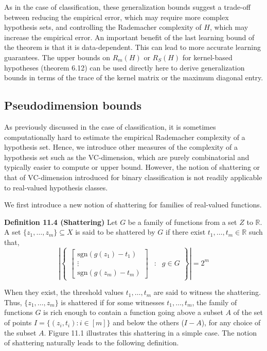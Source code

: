 \documentclass[fleqn,10pt]{olplainarticle}
\begin{document}
As in the case of classification, these generalization bounds suggest a trade-off between reducing the empirical error, which may require more complex hypothesis sets, and controlling the Rademacher complexity of \(H\), which may increase the empirical error. An important benefit of the last learning bound of the theorem is that it is data-dependent. This can lead to more accurate learning guarantees. The upper bounds on \(R_m(H)\) or \(R_S(H)\) for kernel-based hypotheses (theorem 6.12) can be used directly here to derive generalization bounds in terms of the trace of the kernel matrix or the maximum diagonal entry.


\subsection{Pseudodimension bounds}

As previously discussed in the case of classification, it is sometimes computationally hard to estimate the empirical Rademacher complexity of a hypothesis set. Hence, we introduce other measures of the complexity of a hypothesis set such as the VC-dimension, which are purely combinatorial and typically easier to compute or upper bound. However, the notion of shattering or that of VC-dimension introduced for binary classification is not readily applicable to real-valued hypothesis classes.

We first introduce a new notion of shattering for families of real-valued functions.

\textbf{Definition 11.4 (Shattering)} Let $G$ be a family of functions from a set $Z$ to $\mathbb{R}$. A set \(\{z_1, \ldots , z_m\} \subseteq X\) is said to be shattered by $G$ if there exist \(t_1, \ldots , t_m \in \mathbb{R} \) such that,
\[
\left| \left\{
\begin{array}{cccc}
\begin{bmatrix}
\mathrm{sgn}(g(z_1) - t_1) \\
\vdots \\
\mathrm{sgn}(g(z_m) - t_m)
\end{bmatrix} & : & g \in G
\end{array}
\right\} \right| = 2^m
\]


When they exist, the threshold values $t_1, \ldots , t_m$ are said to witness the shattering. Thus, \(\{z_1, \ldots , z_m\}\) is shattered if for some witnesses $t_1, \ldots , t_m$, the family of functions $G$ is rich enough to contain a function going above a subset $A$ of the set of points $I = \{(z_i, t_i) : i \in [m]\}$ and below the others ($I - A$), for any choice of the subset $A$. Figure 11.1 illustrates this shattering in a simple case. The notion of shattering naturally leads to the following definition.
\end{document}
